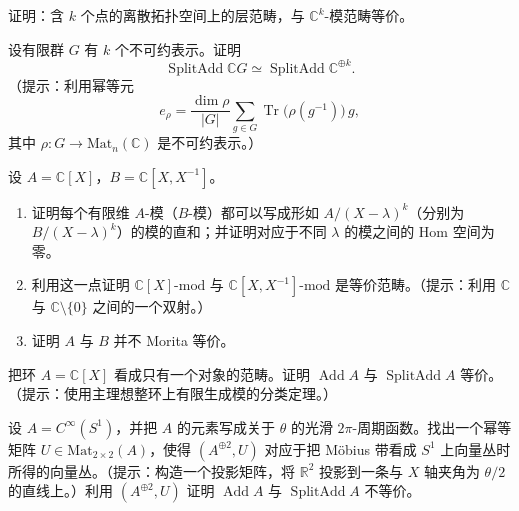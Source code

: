 \begin{exercise}\label{exer:categories-presheaves}
证明：含 $k$ 个点的离散拓扑空间上的层范畴，与 $\mathbb C^k$-模范畴等价。
\end{exercise}

\begin{exercise}\label{exer:categories-finite-group}
设有限群 $G$ 有 $k$ 个不可约表示。证明
\[
  \operatorname{SplitAdd}\mathbb CG
  \simeq\operatorname{SplitAdd}\mathbb C^{\oplus k}.
\]
（提示：利用幂等元
\[
  e_\rho=\frac{\dim\rho}{|G|}
  \sum_{g\in G}\operatorname{Tr}\bigl(\rho(g^{-1})\bigr)\,g,
\]
其中 $\rho\colon G\to\mathrm{Mat}_n(\mathbb C)$ 是不可约表示。）
\end{exercise}

\begin{exercise}\label{exer:categories-polynomial-laurent}
设 $A=\mathbb C[X]$，$B=\mathbb C[X,X^{-1}]$。
\begin{enumerate}
  \item 证明每个有限维 $A$-模（$B$-模）都可以写成形如 $A/(X-\lambda)^k$（分别为 $B/(X-\lambda)^k$）的模的直和；并证明对应于不同 $\lambda$ 的模之间的 Hom 空间为零。
  \item 利用这一点证明 $\mathbb C[X]\text{-}\mathrm{mod}$ 与 $\mathbb C[X,X^{-1}]\text{-}\mathrm{mod}$ 是等价范畴。（提示：利用 $\mathbb C$ 与 $\mathbb C\setminus\{0\}$ 之间的一个双射。）
  \item 证明 $A$ 与 $B$ 并不 Morita 等价。
\end{enumerate}
\end{exercise}

\begin{exercise}\label{exer:categories-pid}
把环 $A=\mathbb C[X]$ 看成只有一个对象的范畴。证明 $\operatorname{Add}A$ 与 $\operatorname{SplitAdd}A$ 等价。（提示：使用主理想整环上有限生成模的分类定理。）
\end{exercise}

\begin{exercise}\label{exer:categories-mobius}
设 $A=C^\infty(S^1)$，并把 $A$ 的元素写成关于 $\theta$ 的光滑 $2\pi$-周期函数。找出一个幂等矩阵 $U\in\mathrm{Mat}_{2\times2}(A)$，使得 $(A^{\oplus2},U)$ 对应于把 Möbius 带看成 $S^1$ 上向量丛时所得的向量丛。（提示：构造一个投影矩阵，将 $\mathbb R^2$ 投影到一条与 $X$ 轴夹角为 $\theta/2$ 的直线上。）利用 $(A^{\oplus2},U)$ 证明 $\operatorname{Add}A$ 与 $\operatorname{SplitAdd}A$ 不等价。
\end{exercise}

